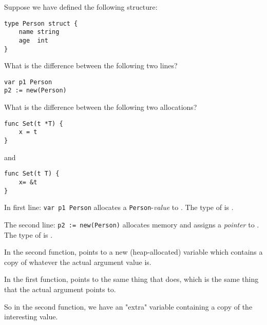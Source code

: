 \begin{Exercise}[title={Pointers},difficulty=6]
\label{ex:pointers}

\Question
Suppose we have defined the following structure:
\begin{lstlisting}
type Person struct {
    name string
    age	 int
}
\end{lstlisting}

What is the difference between the following two lines?
\begin{lstlisting}
var p1 Person
p2 := new(Person)
\end{lstlisting}

\Question
What is the difference between the following two allocations?
\begin{lstlisting}[numbers=none]
func Set(t *T) {
    x = t
}
\end{lstlisting}
and
\begin{lstlisting}[numbers=none]
func Set(t T) {
    x= &t
}
\end{lstlisting}
\end{Exercise}

\begin{Answer}
\Question
In first line: \lstinline{var p1 Person} allocates a
\texttt{Person}-\emph{value} to . The type of  is
.

The second line: \lstinline{p2 := new(Person)} allocates memory
and assigns a \emph{pointer} to . The type of  is
.

\Question
In the second function,  points to a new
(heap-allocated) variable  which contains
a copy of whatever the actual argument value is.

In the first function,  points to the same thing
that  does, which is the same thing that the actual
argument points to.

So in the second function, we have an "extra" variable
containing a copy of the interesting value.
\end{Answer}
